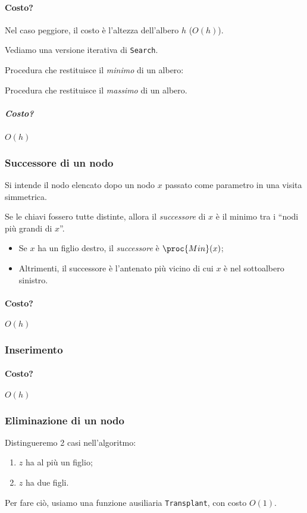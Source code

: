 

\paragraph{Costo?} Nel caso peggiore, il costo è l'altezza dell'albero $h$ ($O(h)$).

\bigskip
Vediamo una versione iterativa di \texttt{Search}.


Procedura che restituisce il \emph{minimo} di un albero:


Procedura che restituisce il \emph{massimo} di un albero.


\subparagraph{Costo?} $O(h)$

\subsubsection{Successore di un nodo}
Si intende il nodo elencato dopo un nodo $x$ passato come parametro in una visita simmetrica.

Se le chiavi fossero tutte distinte, allora il \emph{successore} di $x$ 
è il minimo tra i ``nodi più grandi di $x$''.
\begin{itemize}
	\item Se $x$ ha un figlio destro, il \emph{successore} è $\proc{Min}(x)$;
	\item Altrimenti, il successore è l'antenato più vicino di cui $x$ è nel 
	sottoalbero sinistro.
\end{itemize}


\paragraph{Costo?} $O(h)$


\subsubsection{Inserimento}



\paragraph{Costo?} $O(h)$

\subsubsection{Eliminazione di un nodo}
Distingueremo 2 casi nell'algoritmo:
\begin{enumerate}[label=($\arabic*$)]
	\item $z$ ha al più un figlio;
	\item $z$ ha due figli.
\end{enumerate}
Per fare ciò, usiamo una funzione ausiliaria \texttt{Transplant}, con 
costo $O(1)$.

